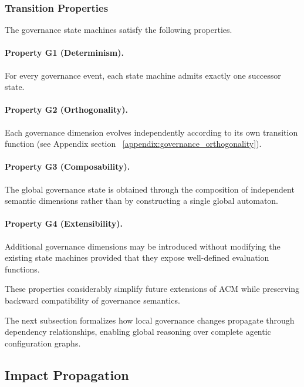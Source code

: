 \documentclass[10pt]{article}
\begin{document}
\subsubsection{Transition Properties}

The governance state machines satisfy the following properties.

\paragraph{Property G1 (Determinism).}

For every governance event, each state machine admits exactly one successor
state.

\paragraph{Property G2 (Orthogonality).}

Each governance dimension evolves independently according to its own transition
function (see Appendix section ~\ref{appendix:governance_orthogonality}).

\paragraph{Property G3 (Composability).}

The global governance state is obtained through the composition of independent
semantic dimensions rather than by constructing a single global automaton.

\paragraph{Property G4 (Extensibility).}

Additional governance dimensions may be introduced without modifying the
existing state machines provided that they expose well-defined evaluation
functions.

These properties considerably simplify future extensions of ACM while
preserving backward compatibility of governance semantics.

The next subsection formalizes how local governance changes propagate through
dependency relationships, enabling global reasoning over complete agentic
configuration graphs.

\subsection{Impact Propagation}
\label{subsec:impact_semantics}
\end{document}
